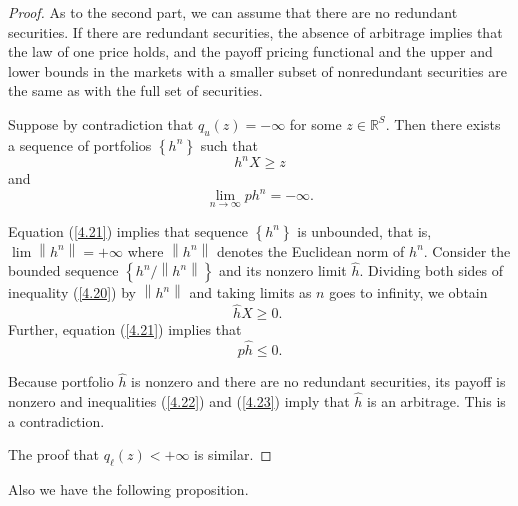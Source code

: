 \documentclass[\topdir/lecture\_notes.tex]{subfiles}
\begin{document}
\begin{optional}
\begin{proof}
As to the second part, we can assume that there are no redundant securities. If there are redundant securities, the absence of arbitrage implies that the law of one price holds, and the payoff pricing functional and the upper and lower bounds in the markets with a smaller subset of nonredundant securities are the same as with the full set of securities.

Suppose by contradiction that \(q_{u}(z)=-\infty\) for some \(z \in \mathbb{R}^{S}\). Then there exists a sequence of portfolios \(\left\{h^{n}\right\}\) such that
\begin{equation}
h^{n} X \geq z \label{4.20}
\end{equation}
and
\begin{equation}
\lim _{n \rightarrow \infty} p h^{n}=-\infty . \label{4.21}
\end{equation}

Equation (\ref{4.21}) implies that sequence \(\left\{h^{n}\right\}\) is unbounded, that is, \(\lim \left\|h^{n}\right\|=+\infty\) where \(\left\|h^{n}\right\|\) denotes the Euclidean norm of \(h^{n}\). Consider the bounded sequence \(\left\{h^{n} /\left\|h^{n}\right\|\right\}\) and its nonzero limit \(\hat{h}\). Dividing both sides of inequality (\ref{4.20}) by \(\left\|h^{n}\right\|\) and taking limits as \(n\) goes to infinity, we obtain
\begin{equation}
\hat{h} X \geq 0 \text {. } \label{4.22}
\end{equation}
Further, equation (\ref{4.21}) implies that
\begin{equation}
p \hat{h} \leq 0 . \label{4.23}
\end{equation}

Because portfolio \(\hat{h}\) is nonzero and there are no redundant securities, its payoff is nonzero and inequalities (\ref{4.22}) and (\ref{4.23}) imply that \(\hat{h}\) is an arbitrage. This is a contradiction.

The proof that \(q_{\ell}(z)<+\infty\) is similar.
\end{proof}

Also we have the following proposition.


\end{optional}
\end{document}
